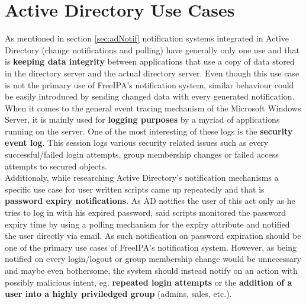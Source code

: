 \section{Active Directory Use Cases}
As mentioned in section \ref{sec:adNotif} notification systems integrated in Active Directory (change notifications and polling) have generally only one use and that is \textbf{keeping data integrity} between applications that use a copy of data
stored in the directory server and the actual directory server. Even though this use case is not the primary use of FreeIPA's notification system, similar behaviour could be easily introduced
by sending changed data with every generated notification. \\
When it comes to the general event tracing mechanism of the Microsoft Windows Server, it is mainly used for \textbf{logging purposes} by a myriad of applications running on the server.
One of the most interesting of these logs is the \textbf{security event log}. This session logs various security related issues such as every successful/failed login attempts, group membership changes
or failed access attempts to secured objects. \\
Additionaly, while researching Active Directory's notification mechanisms a specific use case for user written scripts came up repeatedly and that is \textbf{password expiry notifications}.
As AD notifies the user of this act only as he tries to log in with his expired password, said scripts monitored the password expiry time by using a polling mechanism for the expiry attribute and notified the user directly via email.
As such notification on password expiration should be one of the primary use cases of FreeIPA's notification system.
However, as being notified on every login/logout or group membership change would be unnecessary and maybe even bothersome, the system should instead notify on an action with possibly malicious intent,
eg. \textbf{repeated login attempts} or the \textbf{addition of a user into a highly priviledged group} (admins, sales, etc.).
